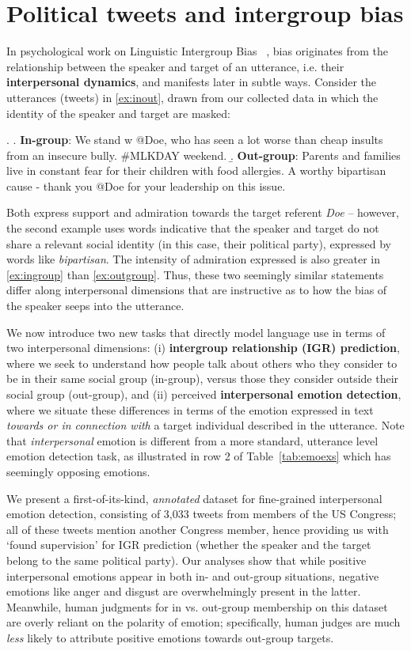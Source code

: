 \chapter{Political tweets and intergroup bias}
\label{chapter:twitter}

In psychological work on Linguistic Intergroup Bias ~\citep{maass_linguistic_1999}, bias originates from the relationship between the speaker and target of an utterance, i.e. their \textbf{interpersonal dynamics}, and manifests later in  subtle ways. Consider the utterances (tweets) in \ref{ex:inout}, drawn from our collected data in which the identity of the speaker and target are masked:

\ex.
\label{ex:inout} \a.\label{ex:ingroup} \textbf{In-group}: We stand w\/ @Doe, who has seen a lot worse than cheap insults from an insecure bully. \#MLKDAY weekend.
\b.\label{ex:outgroup} \textbf{Out-group}: Parents and families live in constant fear for their children with food allergies. A worthy bipartisan cause - thank you @Doe for your leadership on this issue.


\noindent Both express support and admiration towards the target referent \emph{Doe} -- however, the second example uses words indicative that the speaker and target do not share a relevant social identity (in this case, their political party), expressed by words like \emph{bipartisan}. The intensity of admiration expressed is also greater in \ref{ex:ingroup} than \ref{ex:outgroup}. Thus, these two seemingly similar statements differ along interpersonal dimensions that are instructive as to how the bias of the speaker seeps into the utterance.

We now introduce two new tasks that directly model language use in terms of two interpersonal dimensions: (i) \textbf{intergroup relationship (IGR) prediction}, where we seek to understand how people talk about others who they consider to be in their same social group (in-group), versus those they consider outside their social group (out-group), and (ii) perceived \textbf{interpersonal emotion detection}, where we situate these differences in terms of the emotion expressed in text \emph{towards or in connection with} a target individual described in the utterance. Note that \emph{interpersonal} emotion is different from a more standard, utterance level emotion detection task, as illustrated in row 2 of Table~\ref{tab:emoexs} which has seemingly opposing emotions.

We present a first-of-its-kind, \emph{annotated} dataset for fine-grained interpersonal emotion detection, consisting of 3,033 tweets from members of the US Congress; all of these tweets mention another Congress member, hence providing us with `found supervision' for IGR prediction (whether the speaker and the target belong to the same political party). Our analyses show that while positive interpersonal emotions appear in both in- and out-group situations, negative emotions like anger and disgust are overwhelmingly present in the latter. Meanwhile, human judgments for in vs. out-group membership on this dataset are overly reliant on the polarity of emotion; specifically, human judges are much \emph{less} likely to attribute positive emotions towards out-group targets.

